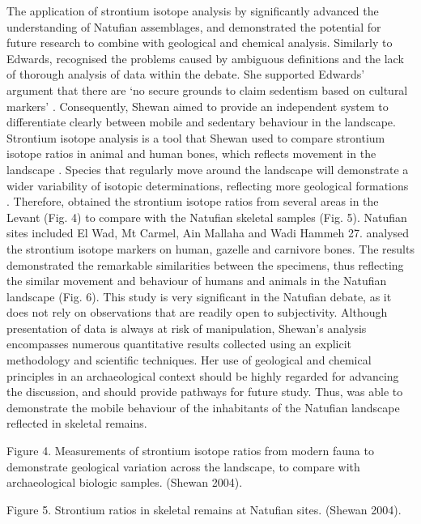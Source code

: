 \documentclass[%
	]{ijsra}
\begin{document}
The application of strontium isotope analysis by \textcite{Shewan_2004} significantly advanced the understanding of Natufian assemblages, and demonstrated the potential for future research to combine with geological and chemical analysis. 
Similarly to Edwards, \textcite[55]{Shewan_2004} recognised the problems caused by ambiguous definitions and the lack of thorough analysis of data within the debate. 
She supported Edwards’ argument that there are ‘no secure grounds to claim sedentism based on cultural markers’ \parencite[57]{Shewan_2004}. Consequently, Shewan aimed to provide an independent system to differentiate clearly between mobile and sedentary behaviour in the landscape. 
Strontium isotope analysis is a tool that Shewan used to compare strontium isotope ratios in animal and human bones, which reflects movement in the landscape \parencite[59]{Shewan_2004}. 
Species that regularly move around the landscape will demonstrate a wider variability of isotopic determinations, reflecting more geological formations \parencite[61]{Shewan_2004}. 
Therefore, \textcite[62]{Shewan_2004} obtained the strontium isotope ratios from several areas in the Levant (Fig. 4) to compare with the Natufian skeletal samples (Fig. 5). 
Natufian sites included El Wad, Mt Carmel, Ain Mallaha and Wadi Hammeh 27. \textcite[71]{Shewan_2004} analysed the strontium isotope markers on human, gazelle and carnivore bones. 
The results demonstrated the remarkable similarities between the specimens, thus reflecting the similar movement and behaviour of humans and animals in the Natufian landscape \parencite[79]{Shewan_2004} (Fig. 6). 
This study is very significant in the Natufian debate, as it does not rely on observations that are readily open to subjectivity. Although presentation of data is always at risk of manipulation, Shewan’s analysis encompasses numerous quantitative results collected using an explicit methodology and scientific techniques. Her use of geological and chemical principles in an archaeological context should be highly regarded for advancing the discussion, and should provide pathways for future study. Thus, \textcite{Shewan_2004} was able to demonstrate the mobile behaviour of the inhabitants of the Natufian landscape reflected in skeletal remains.

Figure 4. Measurements of strontium isotope ratios from modern fauna to demonstrate geological variation across the landscape, to compare with archaeological biologic samples. (Shewan 2004).

Figure 5. Strontium ratios in skeletal remains at Natufian sites. (Shewan 2004).
\end{document}
